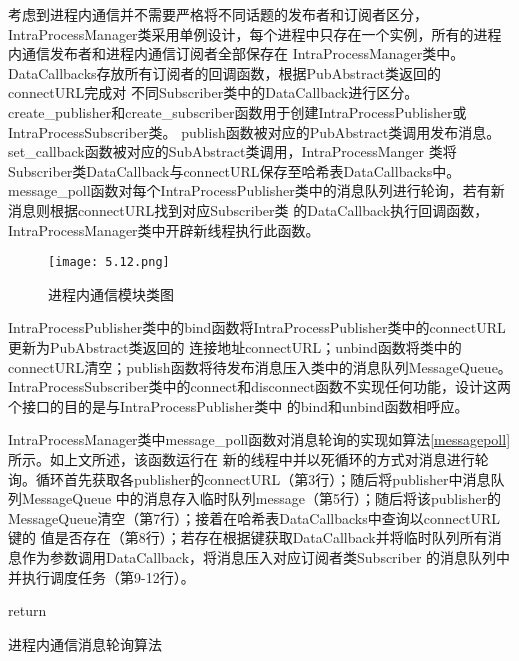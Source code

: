 考虑到进程内通信并不需要严格将不同话题的发布者和订阅者区分，
IntraProcessManager类采用单例设计，每个进程中只存在一个实例，所有的进程内通信发布者和进程内通信订阅者全部保存在
IntraProcessManager类中。DataCallbacks存放所有订阅者的回调函数，根据PubAbstract类返回的connectURL完成对
不同Subscriber类中的DataCallback进行区分。
create\_publisher和create\_subscriber函数用于创建IntraProcessPublisher或IntraProcessSubscriber类。
publish函数被对应的PubAbstract类调用发布消息。
set\_callback函数被对应的SubAbstract类调用，IntraProcessManger
类将Subscriber类DataCallback与connectURL保存至哈希表DataCallbacks中。
message\_poll函数对每个IntraProcessPublisher类中的消息队列进行轮询，若有新消息则根据connectURL找到对应Subscriber类
的DataCallback执行回调函数，IntraProcessManager类中开辟新线程执行此函数。
\begin{figure}[H]
  \centering
  \texttt{[image: 5.12.png]}
  \caption{进程内通信模块类图}
  \label{intraprocess_communication_class}
\end{figure}
IntraProcessPublisher类中的bind函数将IntraProcessPublisher类中的connectURL更新为PubAbstract类返回的
连接地址connectURL；unbind函数将类中的connectURL清空；publish函数将待发布消息压入类中的消息队列MessageQueue。
IntraProcessSubscriber类中的connect和disconnect函数不实现任何功能，设计这两个接口的目的是与IntraProcessPublisher类中
的bind和unbind函数相呼应。

IntraProcessManager类中message\_poll函数对消息轮询的实现如算法\ref{messagepoll}所示。如上文所述，该函数运行在
新的线程中并以死循环的方式对消息进行轮询。循环首先获取各publisher的connectURL（第3行）；随后将publisher中消息队列MessageQueue
中的消息存入临时队列message（第5行）；随后将该publisher的MessageQueue清空（第7行）；接着在哈希表DataCallbacks中查询以connectURL键的
值是否存在（第8行）；若存在根据键获取DataCallback并将临时队列所有消息作为参数调用DataCallback，将消息压入对应订阅者类Subscriber
的消息队列中并执行调度任务（第9-12行）。
\begin{algorithm}
  \small
  \SetAlgoLined
  return 
  \caption{进程内通信消息轮询算法}
  \label{messagepoll}
\end{algorithm}

